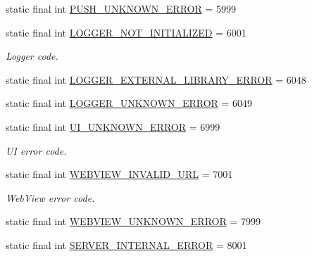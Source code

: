 \begin{DoxyCompactItemize}
\item 
static final int \hyperlink{classcom_1_1toast_1_1android_1_1gamebase_1_1base_1_1_gamebase_error_a823a5ca14fe66e59c63f710e2d67f4e8}{P\+U\+S\+H\+\_\+\+U\+N\+K\+N\+O\+W\+N\+\_\+\+E\+R\+R\+OR} = 5999
\item 
static final int \hyperlink{classcom_1_1toast_1_1android_1_1gamebase_1_1base_1_1_gamebase_error_a3d318bd428efcb4afb70a5044fa576d6}{L\+O\+G\+G\+E\+R\+\_\+\+N\+O\+T\+\_\+\+I\+N\+I\+T\+I\+A\+L\+I\+Z\+ED} = 6001
\begin{DoxyCompactList}\small\item\em Logger code. \end{DoxyCompactList}\item 
static final int \hyperlink{classcom_1_1toast_1_1android_1_1gamebase_1_1base_1_1_gamebase_error_a04e2d71d85a6c52d68be48a80a6376bc}{L\+O\+G\+G\+E\+R\+\_\+\+E\+X\+T\+E\+R\+N\+A\+L\+\_\+\+L\+I\+B\+R\+A\+R\+Y\+\_\+\+E\+R\+R\+OR} = 6048
\item 
static final int \hyperlink{classcom_1_1toast_1_1android_1_1gamebase_1_1base_1_1_gamebase_error_a9bc34722e36d94d0e8c68e6ae4be9576}{L\+O\+G\+G\+E\+R\+\_\+\+U\+N\+K\+N\+O\+W\+N\+\_\+\+E\+R\+R\+OR} = 6049
\item 
static final int \hyperlink{classcom_1_1toast_1_1android_1_1gamebase_1_1base_1_1_gamebase_error_a4c0ed79f0ab3029b200531931583be9f}{U\+I\+\_\+\+U\+N\+K\+N\+O\+W\+N\+\_\+\+E\+R\+R\+OR} = 6999
\begin{DoxyCompactList}\small\item\em UI error code. \end{DoxyCompactList}\item 
static final int \hyperlink{classcom_1_1toast_1_1android_1_1gamebase_1_1base_1_1_gamebase_error_a5efd97b69e79d6b5296265443a7da202}{W\+E\+B\+V\+I\+E\+W\+\_\+\+I\+N\+V\+A\+L\+I\+D\+\_\+\+U\+RL} = 7001
\begin{DoxyCompactList}\small\item\em Web\+View error code. \end{DoxyCompactList}\item 
static final int \hyperlink{classcom_1_1toast_1_1android_1_1gamebase_1_1base_1_1_gamebase_error_a5d107027e581550a08babbfd2440da86}{W\+E\+B\+V\+I\+E\+W\+\_\+\+U\+N\+K\+N\+O\+W\+N\+\_\+\+E\+R\+R\+OR} = 7999
\item 
static final int \hyperlink{classcom_1_1toast_1_1android_1_1gamebase_1_1base_1_1_gamebase_error_abb8bcf6617c8d01173161a51a0668ca4}{S\+E\+R\+V\+E\+R\+\_\+\+I\+N\+T\+E\+R\+N\+A\+L\+\_\+\+E\+R\+R\+OR} = 8001

\end{DoxyCompactItemize}
